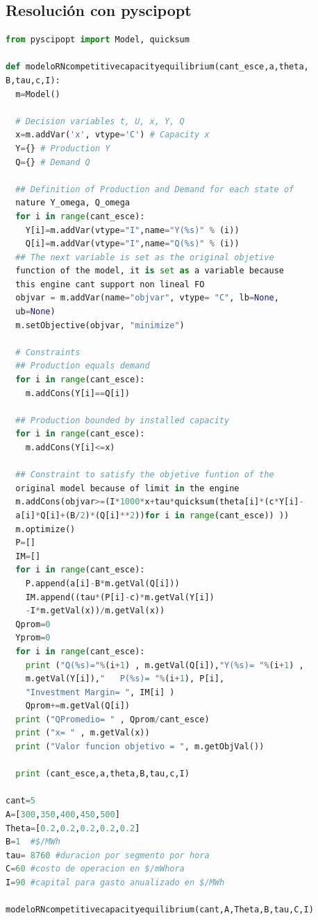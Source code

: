 \subsection{Resolución con pyscipopt}

\begin{lstlisting}[language=Python]
from pyscipopt import Model, quicksum

def modeloRNcompetitivecapacityequilibrium(cant_esce,a,theta,
B,tau,c,I):
  m=Model()
  
  # Decision variables t, U, x, Y, Q
  x=m.addVar('x', vtype='C') # Capacity x
  Y={} # Production Y
  Q={} # Demand Q
  
  ## Definition of Production and Demand for each state of
  nature Y_omega, Q_omega
  for i in range(cant_esce):
    Y[i]=m.addVar(vtype="I",name="Y(%s)" % (i))
    Q[i]=m.addVar(vtype="I",name="Q(%s)" % (i))
  ## The next variable is set as the original objetive
  function of the model, it is set as a variable because
  this engine cant support non lineal FO
  objvar = m.addVar(name="objvar", vtype= "C", lb=None,
  ub=None)
  m.setObjective(objvar, "minimize")
  
  # Constraints
  ## Production equals demand    
  for i in range(cant_esce):
    m.addCons(Y[i]==Q[i])
  
  ## Production bounded by installed capacity  
  for i in range(cant_esce):
    m.addCons(Y[i]<=x)  
  
  ## Constraint to satisfy the objetive funtion of the
  original model because of limit in the engine   
  m.addCons(objvar>=(I*1000*x+tau*quicksum(theta[i]*(c*Y[i]-
  a[i]*Q[i]+(B/2)*(Q[i]**2))for i in range(cant_esce)) ))
  m.optimize()
  P=[]
  IM=[]
  for i in range(cant_esce):
    P.append(a[i]-B*m.getVal(Q[i]))
    IM.append((tau*(P[i]-c)*m.getVal(Y[i])
    -I*m.getVal(x))/m.getVal(x))
  Qprom=0
  Yprom=0
  for i in range(cant_esce):
    print ("Q(%s)="%(i+1) , m.getVal(Q[i]),"Y(%s)= "%(i+1) ,
    m.getVal(Y[i]),"   P(%s)= "%(i+1), P[i],
    "Investment Margin= ", IM[i] )
    Qprom+=m.getVal(Q[i])
  print ("QPromedio= " , Qprom/cant_esce)
  print ("x= " , m.getVal(x))
  print ("Valor funcion objetivo = ", m.getObjVal())

  print (cant_esce,a,theta,B,tau,c,I)

cant=5
A=[300,350,400,450,500]
Theta=[0.2,0.2,0.2,0.2,0.2]
B=1  #$/MWh
tau= 8760 #duracion por segmento por hora
C=60 #costo de operacion en $/mWhora
I=90 #capital para gasto anualizado en $/MWh

modeloRNcompetitivecapacityequilibrium(cant,A,Theta,B,tau,C,I) 
\end{lstlisting}

